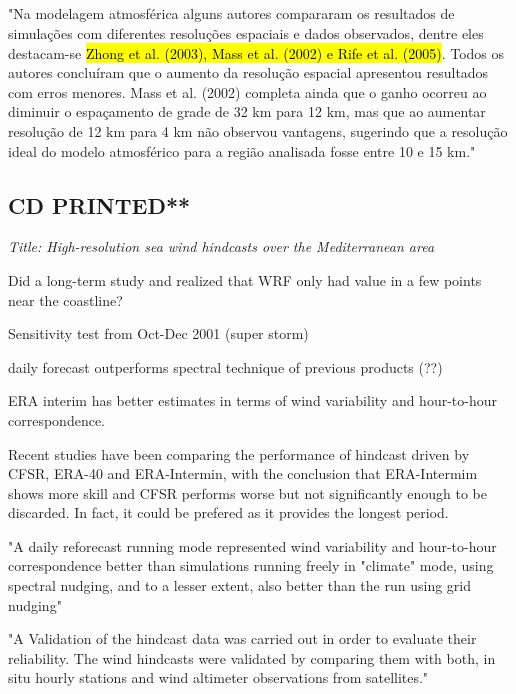 \documentclass[12pt,a4paper]{article}
\begin{document}
\subsection{\cite{Lewis2017}}


"Na modelagem atmosférica alguns autores compararam os resultados de simulações com diferentes resoluções espaciais e dados observados, dentre eles destacam-se \hl{Zhong et al. (2003), Mass et al. (2002) e Rife et al. (2005)}. Todos os autores concluíram que o aumento da resolução espacial apresentou resultados com erros menores. Mass et al. (2002) completa ainda que o ganho ocorreu ao diminuir o espaçamento de grade de 32 km para 12 km, mas que ao aumentar resolução de 12 km para 4 km não observou vantagens, sugerindo que a resolução ideal do modelo atmosférico para a região analisada fosse entre 10 e 15 km."


\subsection{\cite{Menendez2014} CD PRINTED**}

\textit{Title: High-resolution sea wind hindcasts over the Mediterranean area}

Did a long-term study and realized that WRF only had value in a few points near the coastline?

Sensitivity test from Oct-Dec 2001 (super storm)

daily forecast outperforms spectral technique of previous products (??)

ERA interim has better estimates in terms of wind variability and hour-to-hour correspondence. 

Recent studies have been comparing the performance of hindcast driven by \gls{CFSR}, ERA-40 and ERA-Intermin, with the conclusion that ERA-Intermim shows more skill and \gls{CFSR} performs worse but not significantly enough to be discarded. In fact, it could be prefered as it provides the longest period. 

"A daily reforecast running mode represented wind variability and hour-to-hour correspondence better than simulations running freely in "climate" mode, using spectral nudging, and to a lesser extent, also better than the run using grid nudging"

"A Validation of the hindcast data was carried out in order to evaluate their reliability. The wind hindcasts were validated by comparing them with both, in situ hourly stations and wind altimeter observations from satellites."
\end{document}
